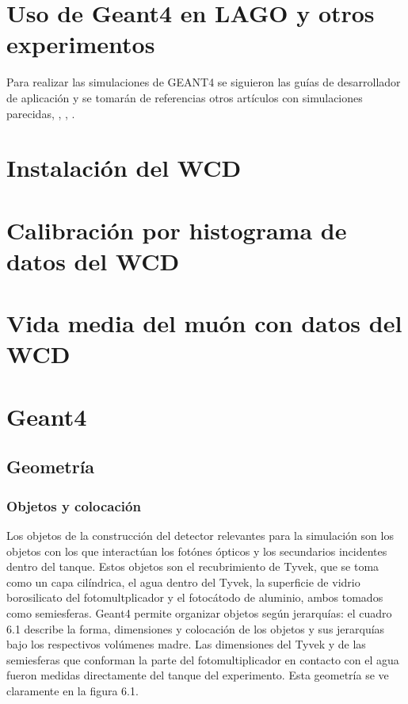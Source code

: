 \documentclass{book}
\begin{document}
\section{Uso de Geant4 en LAGO y otros experimentos}

Para realizar las simulaciones de GEANT4 se siguieron las gu\'ias de desarrollador de aplicaci\'on y se tomar\'an de referencias otros art\'iculos con simulaciones parecidas, \citep{NIELSEN}, \citep{CHEN}, \citep{CALDERON}.



\section{Instalaci\'on del WCD}

\section{Calibraci\'on por histograma de datos del WCD}

\section{Vida media del mu\'on con datos del WCD}

\section{Geant4}
\subsection{Geometr\'ia}
\subsubsection{Objetos y colocaci\'on}

Los objetos de la construcci\'on del detector relevantes para la simulaci\'on son los objetos con los que interact\'uan los fot\'ones \'opticos y los secundarios incidentes dentro del tanque. Estos objetos son el recubrimiento de Tyvek, que se toma como un capa cil\'indrica, el agua dentro del Tyvek, la superficie de vidrio borosilicato del fotomultplicador y el fotoc\'atodo de aluminio, ambos tomados como semiesferas. Geant4 permite organizar objetos seg\'un jerarqu\'ias: el cuadro 6.1 describe la forma, dimensiones y colocaci\'on de los objetos y sus jerarqu\'ias bajo los respectivos vol\'umenes madre. Las dimensiones del Tyvek y de las semiesferas que conforman la parte del fotomultiplicador en contacto con el agua fueron medidas directamente del tanque del experimento. Esta geometr\'ia se ve claramente en la figura 6.1.
\end{document}
